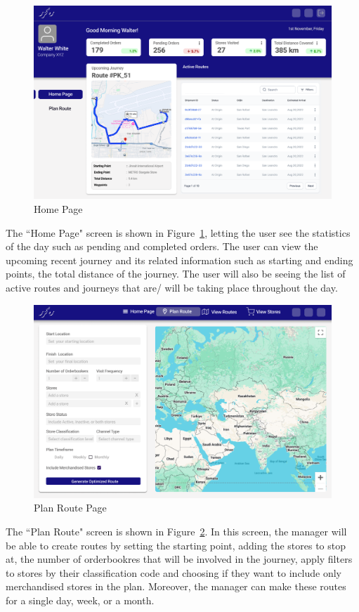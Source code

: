 \begin{figure}[H]
    \centering
    \includegraphics[width=1\textwidth]{images/Home.png} %
    \caption{Home Page}
    \label{fig:image3}
\end{figure}
The ``Home Page" screen is shown in Figure~\ref{fig:image3}, letting the user see the statistics of the day such as pending and completed orders. The user can view the upcoming recent journey and its related information such as starting and ending points, the total distance of the journey. The user will also be seeing the list of active routes and journeys that are/ will be taking place throughout the day.

\begin{figure}[H]
    \centering
    \includegraphics[width=1\textwidth]{images/Plan Route.png} %
    \caption{Plan Route Page}
    \label{fig:image4}
\end{figure}
The ``Plan Route" screen is shown in Figure~\ref{fig:image4}. In this screen, the manager will be able to create routes by setting the starting point, adding the stores to stop at, the number of orderbookres that will be involved in the journey, apply filters to stores by their classification code and choosing if they want to include only merchandised stores in the plan. Moreover, the manager can make these routes for a single day, week, or a month.

